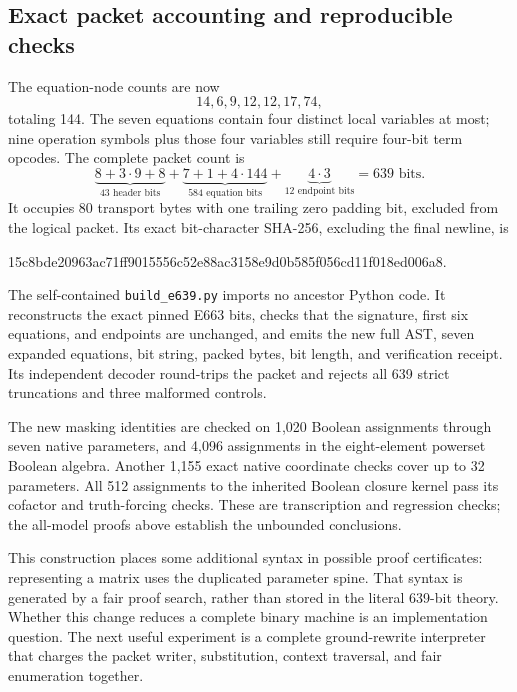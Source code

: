 \subsection{Exact packet accounting and reproducible checks}

The equation-node counts are now
\[
                 14,6,9,12,12,17,74,
\]
totaling 144.  The seven equations contain four distinct local
variables at most; nine operation symbols plus those four
variables still require four-bit term opcodes.  The complete
packet count is
\[
 \underbrace{8+3\cdot9+8}_{43\text{ header bits}}
 +\underbrace{7+1+4\cdot144}_{584\text{ equation bits}}
 +\underbrace{4\cdot3}_{12\text{ endpoint bits}}
 =\boxed{639\text{ bits}}.
\]
It occupies 80 transport bytes with one trailing zero padding
bit, excluded from the logical packet.  Its exact bit-character
SHA-256, excluding the final newline, is
\begin{center}\scriptsize\ttfamily
15c8bde20963ac71ff9015556c52e88ac3158e9d0b585f056cd11f018ed006a8.
\end{center}

The self-contained \texttt{build\_e639.py} imports no ancestor
Python code.  It reconstructs the exact pinned E663 bits, checks
that the signature, first six equations, and endpoints are unchanged,
and emits the new full AST, seven expanded equations, bit string,
packed bytes, bit length, and verification receipt.  Its independent
decoder round-trips the packet and rejects all 639 strict truncations
and three malformed controls.

The new masking identities are checked on 1,020 Boolean assignments
through seven native parameters, and 4,096 assignments in the
eight-element powerset Boolean algebra.  Another 1,155 exact native
coordinate checks cover up to 32 parameters.  All 512 assignments
to the inherited Boolean closure kernel pass its cofactor and
truth-forcing checks.  These are transcription and regression checks;
the all-model proofs above establish the unbounded conclusions.

This construction places some additional syntax in possible proof
certificates: representing a matrix uses the duplicated parameter
spine.  That syntax is generated by a fair proof search, rather
than stored in the literal 639-bit theory.  Whether this change
reduces a complete binary machine is an implementation question.
The next useful experiment is a complete ground-rewrite interpreter
that charges the packet writer, substitution, context traversal,
and fair enumeration together.
